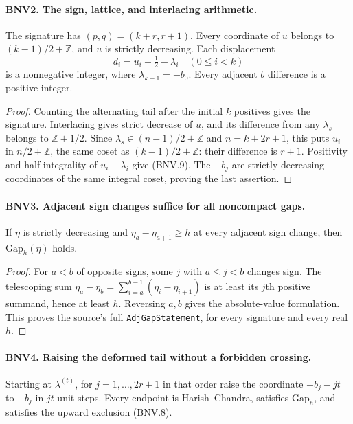 \paragraph{BNV2. The sign, lattice, and interlacing arithmetic.}
\label{claim:BNV2}
The signature has $(p,q)=(k+r,r+1)$.  Every coordinate of $u$ belongs to
$(k-1)/2+\mathbb Z$, and $u$ is strictly decreasing.  Each displacement
\[
 d_i=u_i-\tfrac12-\lambda_i\quad(0\le i<k)
 \tag{BNV.9}
\]
is a nonnegative integer, where $\lambda_{k-1}=-b_0$.
Every adjacent $b$ difference is a positive integer.

\begin{proof}
Counting the alternating tail after the initial $k$ positives gives the
signature.  Interlacing gives strict decrease of $u$, and its difference
from any $\lambda_s$ belongs to $\mathbb Z+1/2$.  Since
$\lambda_s\in(n-1)/2+\mathbb Z$ and $n=k+2r+1$, this puts
$u_i$ in $n/2+\mathbb Z$, the same coset as $(k-1)/2+\mathbb Z$:
their difference is $r+1$.  Positivity and half-integrality of
$u_i-\lambda_i$ give (BNV.9).  The $-b_j$ are strictly decreasing
coordinates of the same integral coset, proving the last assertion.
\end{proof}

\paragraph{BNV3. Adjacent sign changes suffice for all noncompact gaps.}
\label{claim:BNV3}
If $\eta$ is strictly decreasing and
$\eta_a-\eta_{a+1}\ge h$ at every adjacent sign change, then
$\mathrm{Gap}_h(\eta)$ holds.

\begin{proof}
For $a<b$ of opposite signs, some $j$ with $a\le j<b$ changes sign.
The telescoping sum
$\eta_a-\eta_b=\sum_{i=a}^{b-1}(\eta_i-\eta_{i+1})$
is at least its $j$th positive summand, hence at least $h$.  Reversing
$a,b$ gives the absolute-value formulation.  This proves the source's full
\texttt{AdjGapStatement}, for every signature and every real $h$.
\end{proof}

\paragraph{BNV4. Raising the deformed tail without a forbidden crossing.}
\label{claim:BNV4}
Starting at $\lambda^{(t)}$, for $j=1,\ldots,2r+1$ in that order raise
the coordinate $-b_j-jt$ to $-b_j$ in $jt$ unit steps.  Every endpoint is
Harish--Chandra, satisfies $\mathrm{Gap}_h$, and satisfies the upward
exclusion (BNV.8).

